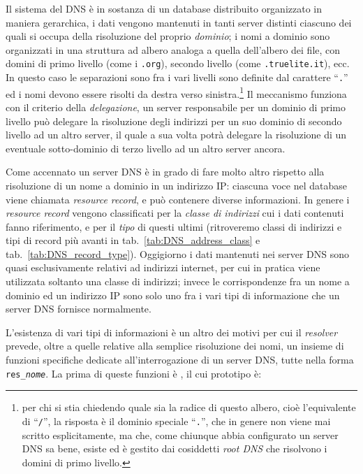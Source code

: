 Il sistema del DNS è in sostanza di un database distribuito organizzato in
maniera gerarchica, i dati vengono mantenuti in tanti server distinti ciascuno
dei quali si occupa della risoluzione del proprio \textsl{dominio}; i nomi a
dominio sono organizzati in una struttura ad albero analoga a quella
dell'albero dei file, con domini di primo livello (come i \texttt{.org}),
secondo livello (come \texttt{.truelite.it}), ecc.  In questo caso le
separazioni sono fra i vari livelli sono definite dal carattere ``\texttt{.}''
ed i nomi devono essere risolti da destra verso sinistra.\footnote{per chi si
  stia chiedendo quale sia la radice di questo albero, cioè l'equivalente di
  ``\texttt{/}'', la risposta è il dominio speciale ``\texttt{.}'', che in
  genere non viene mai scritto esplicitamente, ma che, come chiunque abbia
  configurato un server DNS sa bene, esiste ed è gestito dai cosiddetti
  \textit{root DNS} che risolvono i domini di primo livello.} Il meccanismo
funziona con il criterio della \textsl{delegazione}, un server responsabile
per un dominio di primo livello può delegare la risoluzione degli indirizzi
per un suo dominio di secondo livello ad un altro server, il quale a sua volta
potrà delegare la risoluzione di un eventuale sotto-dominio di terzo livello ad
un altro server ancora.

Come accennato un server DNS è in grado di fare molto altro rispetto alla
risoluzione di un nome a dominio in un indirizzo IP: ciascuna voce nel
database viene chiamata \textit{resource record}, e può contenere diverse
informazioni. In genere i \textit{resource record} vengono classificati per la
\textsl{classe di indirizzi} cui i dati contenuti fanno riferimento, e per il
\textsl{tipo} di questi ultimi (ritroveremo classi di indirizzi e tipi di
record più avanti in tab.~\ref{tab:DNS_address_class} e
tab.~\ref{tab:DNS_record_type}).  Oggigiorno i dati mantenuti nei server DNS
sono quasi esclusivamente relativi ad indirizzi internet, per cui in pratica
viene utilizzata soltanto una classe di indirizzi; invece le corrispondenze
fra un nome a dominio ed un indirizzo IP sono solo uno fra i vari tipi di
informazione che un server DNS fornisce normalmente.

L'esistenza di vari tipi di informazioni è un altro dei motivi per cui il
\textit{resolver} prevede, oltre a quelle relative alla semplice risoluzione
dei nomi, un insieme di funzioni specifiche dedicate all'interrogazione di un
server DNS, tutte nella forma \texttt{res\_}\textsl{\texttt{nome}}. La prima
di queste funzioni è , il cui prototipo è:

